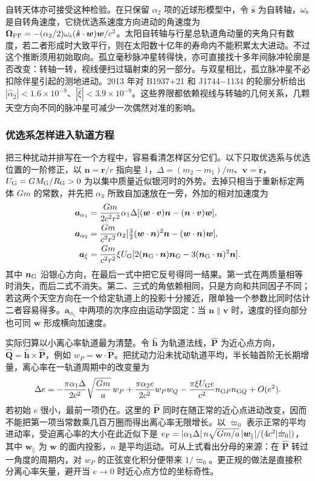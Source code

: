 自转天体亦可接受这种检验。在只保留 $\alpha_2$ 项的近球形模型中，令 $\hat{\bm s}$ 为自转轴，$\omega_{\rm s}$ 是自转角速度，它绕优选系速度方向进动的角速度为 $\bm\Omega_{\rm PF}=-(\alpha_2/2)\omega_{\rm s}(\hat{\bm s}\cdot\bm w)\bm w/c^2$。太阳自转轴与行星总轨道角动量的夹角只有数度，若二者形成时大致平行，则在太阳数十亿年的寿命内不能积累太大进动。不过这个推断须用初始取向。孤立毫秒脉冲星转得快，亦可直接找十多年间脉冲轮廓是否改变：转轴一转，视线便扫过辐射束的另一部分。与双星相比，孤立脉冲星不必扣除伴星引起的测地进动。2013 年对 B1937+21 和 J1744$-$1134 的轮廓分析给出 $|\hat\alpha_2|<1.6\times10^{-9}$、$|\hat\xi|<3.9\times10^{-9}$。这些界限都依赖视线与转轴的几何关系，几颗天空方向不同的脉冲星可减少一次偶然对准的影响。

\subsubsection{优选系怎样进入轨道方程}

把三种扰动并排写在一个方程中，容易看清怎样区分它们。以下只取优选系与优选位置的一阶修正，以 $\bm n=\bm r/r$ 指向星 1，$\Delta=(m_2-m_1)/m$、$\bm v=\dot{\bm r}$，$U_{\rm G}=GM_{\rm G}/R_{\rm G}>0$ 为以集中质量近似银河时的外势。去掉只相当于重新标定两体 $Gm$ 的常数，并先把 $\alpha_3$ 所致自加速放在一旁，外加的相对加速度为
\begin{align*}
 \bm a_{\alpha_1}={}&\frac{Gm}{2c^2r^2}\alpha_1\Delta
       [(\bm w\cdot\bm v)\bm n-(\bm n\cdot\bm v)\bm w] ,\\
 \bm a_{\alpha_2}={}&\frac{Gm}{c^2r^2}\alpha_2
     [\tfrac32(\bm w\cdot\bm n)^2\bm n
                   -(\bm w\cdot\bm n)\bm w],\\
 \bm a_\xi={}&\frac{Gm}{c^2r^2}\xi U_{\rm G}
     [2(\bm n_{\rm G}\cdot\bm n)\bm n_{\rm G}
              -3(\bm n_{\rm G}\cdot\bm n)^2\bm n].
\end{align*}
其中 $\bm n_{\rm G}$ 沿银心方向，在最后一式中把它反号得同一结果。第一式在两质量相等时消失，而后二式不消失。第二、三式的角依赖相同，只是方向和共同因子不同；若这两个天空方向在一个给定轨道上的投影十分接近，限单独一个参数比同时估计二者容易得多。$\bm a_{\alpha_1}$ 中两项的次序应由运动学固定：当 $\bm n\parallel\bm v$ 时，速度的径向部分也可同 $\bm w$ 形成横向加速度。

实际归算以小离心率轨道最为清楚。令 $\hat{\bm h}$ 为轨道法线，$\hat{\bm P}$ 为近心点方向，$\hat{\bm Q}=\hat{\bm h}\times\hat{\bm P}$，例如 $w_P=\bm w\cdot\hat{\bm P}$。把扰动力沿未扰动轨道平均，半长轴首阶无长期增量，离心率在一轨道周期中的改变量为
\[
 \Delta e=-\frac{\pi\alpha_1\Delta}{2c^2}\sqrt{\frac{Gm}{a}}\,w_P
       +\frac{\pi\alpha_2 e}{2c^2}w_Pw_Q
       -\frac{\pi\xi U_{\rm G}e}{c^2}n_{{\rm G}P}n_{{\rm G}Q}
       +O(e^2).
\]
若初始 $e$ 很小，最前一项仍在。这里的 $\hat{\bm P}$ 同时在随正常的近心点进动改变，因而不能把第一项当常数乘几百万圈而得出离心率无限增长。以 $\dot\varpi_0$ 表示正常的平均进动率，受迫离心率的大小在此近似下是 $e_{\rm F}=|\alpha_1\Delta|\,n\sqrt{Gm/a}\,|\bm w_\parallel|/(4c^2|\dot\varpi_0|)$，其中 $\bm w_\parallel$ 为 $\bm w$ 的面内投影，$n$ 是平均运动。可从上式看出分母的来源：在 $\hat{\bm P}$ 转过一角度的周期内，对 $w_P$ 的正弦变化积分便带来 $1/\dot\varpi_0$。更正规的做法是直接积分离心率矢量，避开当 $e\to0$ 时近心点方位的坐标奇性。

